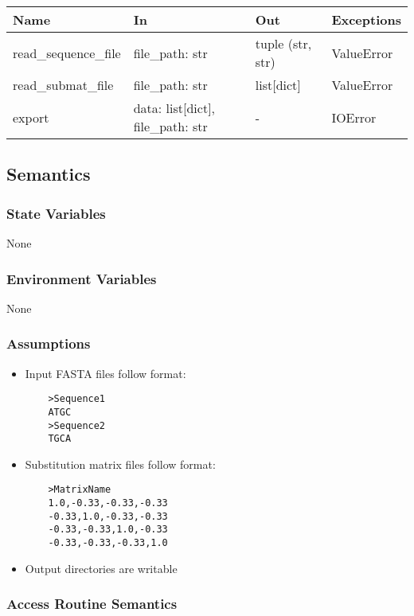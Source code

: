 \documentclass[12pt, titlepage]{article}
\begin{document}
\begin{center}
\begin{tabular}{p{4cm} p{4cm} p{3cm} p{2cm}}
\hline
\textbf{Name} & \textbf{In} & \textbf{Out} & \textbf{Exceptions} \\
\hline
read\_sequence\_file & file\_path: str & tuple (str, str) & ValueError \\
read\_submat\_file & file\_path: str & list[dict] & ValueError \\
export & data: list[dict], file\_path: str & - & IOError \\
\hline
\end{tabular}
\end{center}

\subsection{Semantics}

\subsubsection{State Variables}

None

\subsubsection{Environment Variables}

None

\subsubsection{Assumptions}

\begin{itemize}
    \item Input FASTA files follow format:
    \begin{verbatim}
    >Sequence1
    ATGC
    >Sequence2
    TGCA
    \end{verbatim}
    \item Substitution matrix files follow format:
    \begin{verbatim}
    >MatrixName
    1.0,-0.33,-0.33,-0.33
    -0.33,1.0,-0.33,-0.33
    -0.33,-0.33,1.0,-0.33
    -0.33,-0.33,-0.33,1.0
    \end{verbatim}
    \item Output directories are writable
\end{itemize}

\subsubsection{Access Routine Semantics}
\end{document}

